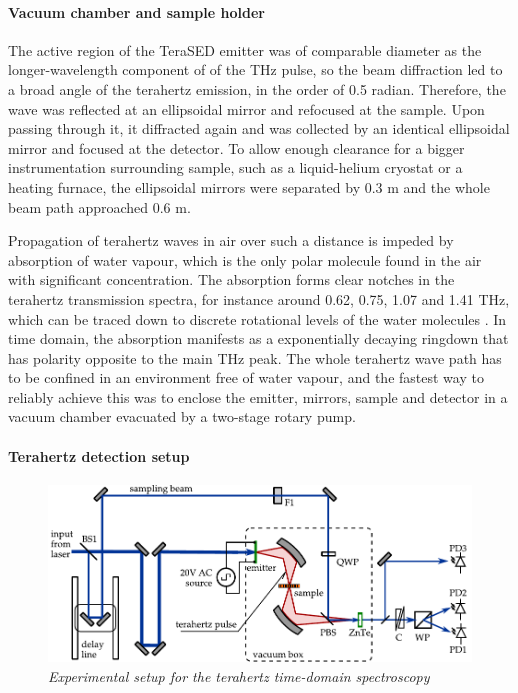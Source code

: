 \paragraph{Vacuum chamber and sample holder}%
The active region of the TeraSED emitter was of comparable diameter as the longer-wavelength component of of the THz pulse, so the beam diffraction led to a broad angle of the terahertz emission, in the order of 0.5 radian. Therefore, the wave was reflected at an ellipsoidal %
 mirror and refocused at the sample. Upon passing through it, it diffracted again and was collected by an identical ellipsoidal mirror and focused at the detector. 
To allow enough clearance for a bigger instrumentation surrounding sample, such as a liquid-helium cryostat or a heating furnace, the ellipsoidal mirrors were separated by 0.3 m and the whole beam path approached 0.6 m. %

Propagation of terahertz waves in air over such a distance is impeded by absorption of water vapour, which is the only polar molecule found in the air with significant concentration. The absorption forms clear notches in the terahertz transmission spectra, for instance around 0.62, 0.75, 1.07 and 1.41 THz, which can be traced down to discrete rotational levels of the water molecules \cite{exter1989}. In time domain, the absorption manifests as a exponentially decaying ringdown that has polarity opposite to the main THz peak.
The whole terahertz wave path has to be confined in an environment free of water vapour, and the fastest way to reliably achieve this was to enclose the emitter, mirrors, sample and detector in a vacuum chamber evacuated by a two-stage rotary pump. 

\paragraph{Terahertz detection setup}%
\begin{figure}[ht] \caption{\textit{Experimental setup for the terahertz time-domain spectroscopy}} \label{fg_exp} \centering 
	\includegraphics[width=\textwidth]{img/exp_THz_sampling.pdf}
\end{figure}

